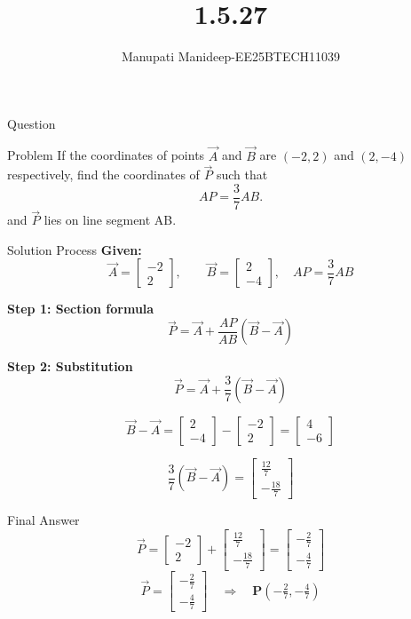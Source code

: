 \documentclass{beamer}
\title %
{1.5.27}
\author %
{Manupati Manideep-EE25BTECH11039}
\begin{document}
\frame{\titlepage}
\begin{frame}{Question}
\begin{block}{Problem}
If the coordinates of points $\vec{A}$ and $\vec{B}$ are $(-2,2)$ and $(2,-4)$ respectively, find the coordinates of $\vec{P}$ such that
\[
AP = \frac{3}{7} AB.
\]
and $\vec{P}$ lies on line segment AB.

\end{block}
\end{frame}

\begin{frame}{Solution Process}
\textbf{Given:}
\[
\vec{A} = \begin{bmatrix}-2 \\ 2\end{bmatrix},\qquad 
\vec{B} = \begin{bmatrix}2 \\ -4\end{bmatrix},\quad
AP = \frac{3}{7}AB
\]

\textbf{Step 1: Section formula}
\[
\vec{P} = \vec{A} + \frac{AP}{AB}(\vec{B}-\vec{A})
\]

\textbf{Step 2: Substitution}
\[
\vec{P} = \vec{A} + \frac{3}{7}(\vec{B}-\vec{A})
\]

\[
\vec{B}-\vec{A} =
\begin{bmatrix}2 \\ -4\end{bmatrix} -
\begin{bmatrix}-2 \\ 2\end{bmatrix} =
\begin{bmatrix}4 \\ -6\end{bmatrix}
\]

\[
\frac{3}{7}(\vec{B}-\vec{A}) =
\begin{bmatrix}\tfrac{12}{7} \\ -\tfrac{18}{7}\end{bmatrix}
\]


\end{frame}

\begin{frame}{Final Answer}
\[
\vec{P} = \begin{bmatrix}-2 \\ 2\end{bmatrix} + 
\begin{bmatrix}\tfrac{12}{7} \\ -\tfrac{18}{7}\end{bmatrix} =
\begin{bmatrix}-\tfrac{2}{7} \\ -\tfrac{4}{7}\end{bmatrix}
\]
\[
\vec{P} = \begin{bmatrix}-\tfrac{2}{7} \\ -\tfrac{4}{7}\end{bmatrix} 
\quad \Rightarrow \quad 
\textbf{P}\left(-\tfrac{2}{7}, -\tfrac{4}{7}\right)
\]
\end{frame}
\end{document}

